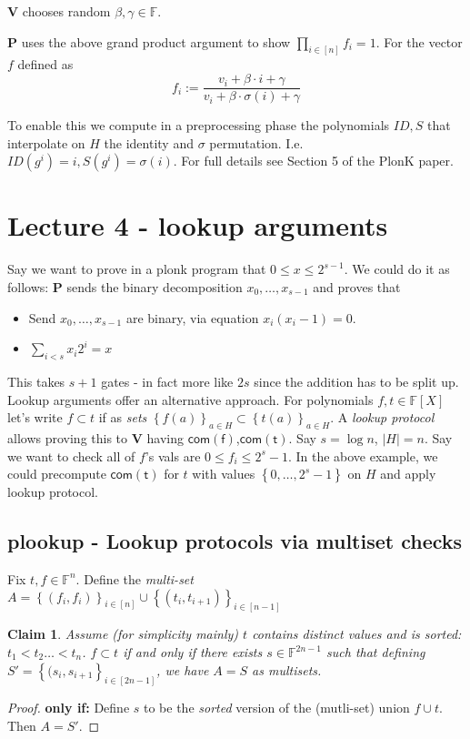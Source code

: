 \documentclass[11pt]{article} %
\newcommand{\F}{\ensuremath{\mathbb F}\xspace}
\newcommand{\com}[1]{\ensuremath{\mathsf{com(#1)}}\xspace}
\newcommand{\defeq}{:=}
\newcommand{\sett}[2]{\ensuremath{\set{#1}_{#2}}\xspace}
\newcommand{\prv}{\ensuremath{\mathsf{\mathbf{P}}}\xspace}
\newcommand{\ver}{\ensuremath{\mathsf{\mathbf{V}}}\xspace}
\newcommand{\set}[1]{\ensuremath{\left\{#1\right\}}\xspace}
\newcommand{\polys}{\ensuremath{\F[X]}\xspace}
\newtheorem{claim}[lemma]{Claim}
\begin{document}
\ver chooses random $\beta,\gamma\in \F$.

\prv uses the above grand product argument to show $\prod_{i\in [n]} f_i =1$.
For the vector $f$ defined as
\[f_i \defeq \frac{v_i + \beta \cdot i +\gamma}{v_i + \beta \cdot \sigma(i) +\gamma}\]

To enable this we compute in a preprocessing phase the polynomials $ID,S$ that interpolate on $H$ the identity and $\sigma$ permutation.
I.e. $ID(g^i)=i, S(g^i)=\sigma(i)$.
For full details see Section 5 of the PlonK paper.





\section{Lecture 4 - lookup arguments}
Say we want to prove in a plonk program
that $0\leq x \leq 2^{s-1}$.
We could do it as follows:
\prv sends the binary decomposition $x_0,\ldots,x_{s-1}$
and proves that
\begin{itemize}
 \item Send $x_0,\ldots,x_{s-1}$ are binary, via equation $x_i(x_i-1)=0$.
 \item $\sum_{i<s} x_i2^i =x$
\end{itemize}
This takes $s+1$ gates - in fact more like $2s$ since the addition has to be split up.
Lookup arguments offer an alternative approach.
For polynomials $f,t\in \polys$ let's write $f\subset t$ if as \emph{sets} $\sett{f(a)}{a\in H}\subset \sett{t(a)}{a\in H}$.
A \emph{lookup protocol} allows proving this to \ver having \com{f},\com{t}.
Say $s=\log n$, $|H|=n$. Say we want to check all of $f$'s vals are $0\leq f_i \leq 2^s-1$.
In the above example, we could precompute \com{t} for $t$ with values \set{0,\ldots,2^s-1} on $H$ 
and apply lookup protocol.

\subsection{plookup - Lookup protocols via multiset checks}
Fix $t,f\in \F^n$. Define the \emph{multi-set} 
$A=\set{(f_i,f_i)}_{i\in [n]}\cup \sett{(t_i,t_{i+1})}{i \in [n-1]}$

\begin{claim}
Assume (for simplicity mainly) $t$ contains distinct values and is sorted: $t_1<t_2\ldots<t_n$.
 $f\subset t$ if and only if there exists $s\in \F^{2n-1}$ such that 
defining $S'=\set{(s_i,s_{i+1}}_{i\in [2n-1]}$, 
we have $A=S$ as multisets.
\end{claim}
\begin{proof}
\textbf{only if:}
Define $s$ to be the \emph{sorted} version of the (mutli-set) union $f\cup t$.
Then $A=S'$.
\end{proof}
\end{document}
